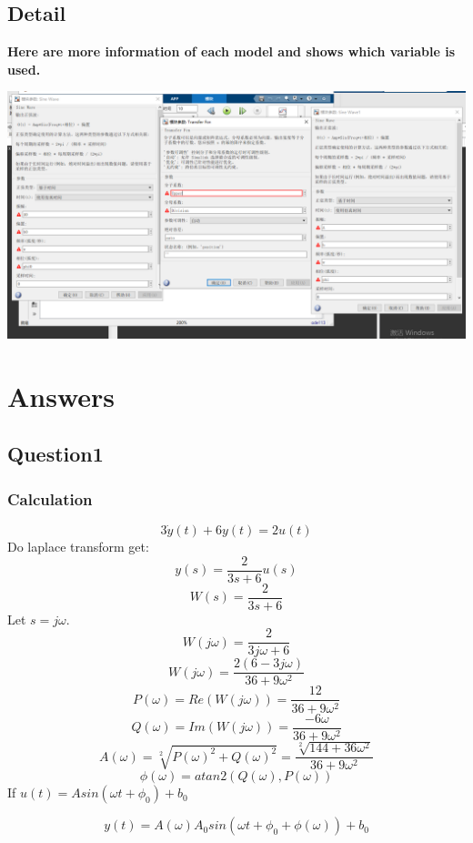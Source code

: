 \documentclass[12pt,a4paper,oneside]{ctexart}
\begin{document}
    \subsection*{Detail}
        \textbf{Here are more information of each model and shows which variable is used.}

        \includegraphics[width = 0.9\linewidth]{Model2.PNG}

\newpage      
\section{Answers}
    \subsection{Question1}
        \subsubsection{Calculation}
            $$3\dot{y}(t) + 6y(t) = 2u(t)$$
            Do laplace transform get:
            $$y(s) = \frac{2}{3s+6}u(s)$$
            $$W(s) = \frac{2}{3s+6}$$
            Let $s = j\omega$.
            $$W(j\omega) = \frac{2}{3j\omega+6}$$
            $$W(j\omega) = \frac{2(6-3j\omega)}{36+9\omega^2}$$
            $$P(\omega) = Re(W(j\omega)) = \frac{12}{36+9\omega^2}$$
            $$Q(\omega) = Im(W(j\omega)) = \frac{-6\omega}{36+9\omega^2}$$
            $$A(\omega) = \sqrt[2]{P(\omega)^2 + Q(\omega)^2} = \frac{\sqrt[2]{144+36\omega^2}}{36+9\omega^2}$$
            $$\phi(\omega) = atan2(Q(\omega),P(\omega))$$
            If $u(t) = Asin(\omega t+\phi_0)+b_0$

            $$y(t) = A(\omega)A_0sin(\omega t + \phi_0 + \phi(\omega)) + b_0$$
\end{document}

